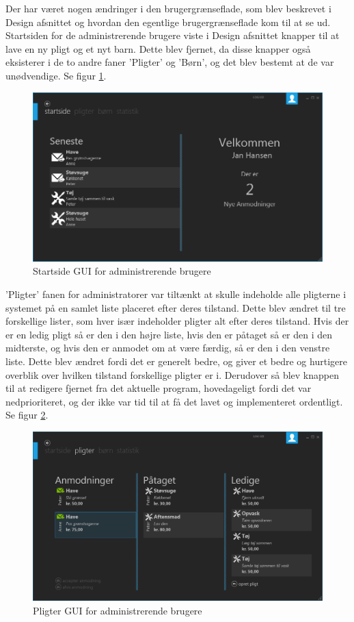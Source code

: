 Der har været nogen ændringer i den brugergrænseflade, som blev beskrevet i Design afsnittet og hvordan den egentlige brugergrænseflade kom til at se ud. Startsiden for de administrerende brugere viste i Design afsnittet knapper til at lave en ny pligt og et nyt barn. Dette blev fjernet, da disse knapper også eksisterer i de to andre faner ’Pligter’ og ’Børn’, og det blev bestemt at de var unødvendige. Se figur \ref{AdminHome}.

\begin{figure}[H]
\centering
\includegraphics[width=1\textwidth]{Billeder/AdminHomeGUI.png}
\caption{Startside GUI for administrerende brugere}
\label{AdminHome}
\end{figure}

’Pligter’ fanen for administratorer var tiltænkt at skulle indeholde alle pligterne i systemet på en samlet liste placeret efter deres tilstand. Dette blev ændret til tre forskellige lister, som hver især indeholder pligter alt efter deres tilstand. Hvis der er en ledig pligt så er den i den højre liste, hvis den er påtaget så er den i den midterste, og hvis den er anmodet om at være færdig, så er den i den venstre liste. Dette blev ændret fordi det er generelt bedre, og giver et bedre og hurtigere overblik over hvilken tilstand forskellige pligter er i. Derudover så blev knappen til at redigere fjernet fra det aktuelle program, hovedageligt fordi det var nedprioriteret, og der ikke var tid til at få det lavet og implementeret ordentligt. Se figur \ref{AdminChore}.

\begin{figure}[H]
\centering
\includegraphics[width=1\textwidth]{Billeder/AdminChoreGUI.png}
\caption{Pligter GUI for administrerende brugere}
\label{AdminChore}
\end{figure}

